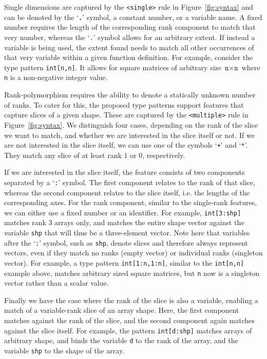 \documentclass[sigconf,screen]{acmart}
\newcommand{\tpdot}{\texttt{\textbf{.}}}
\begin{document}
Single dimensions are captured by the \verb|<single>| rule in Figure~\ref{fig:syntax} and can be denoted by the `\tpdot{}' symbol, a constant number, or a variable name.
A fixed number requires the length of the corresponding rank component to match that very number, whereas the `\texttt{.}' symbol allows for an arbitrary extent.
If instead a variable is being used, the extent found needs to match all other occurrences of that very variable within a given function definition.
For example, consider the type pattern \texttt{int[n,n]}.
It allows for square matrices of arbitrary size $\texttt{n} \times \texttt{n}$ where \texttt{n} is a non-negative integer value.

Rank-polymorphism requires the ability to denote a statically unknown number of ranks.
To cater for this, the proposed type patterns support features that capture slices of a given shape.
These are captured by the \verb|<multiple>| rule in Figure~\ref{fig:syntax}.
We distinguish four cases, depending on the rank of the slice we want to match, and whether we are interested in the slice itself or not.
If we are not interested in the slice itself, we can use one of the symbols `\texttt{+}' and `\texttt{*}'.
They match any slice of at least rank 1 or 0, respectively.

If we are interested in the slice itself, the feature consists of two components separated by a `\texttt{:}' symbol.
The first component relates to the rank of that slice, whereas the second component relates to the slice itself, i.e. the lengths of the corresponding axes.
For the rank component, similar to the single-rank features, we can either use a fixed number or an identifier.
For example, \texttt{int[3:shp]} matches rank 3 arrays only, and matches the entire shape vector against the variable \texttt{shp} that will thus be a three-element vector.
Note here that variables after the `\texttt{:}' symbol, such as \texttt{shp}, denote slices and therefore always represent vectors, even if they match no ranks (empty vector) or individual ranks (singleton vector).
For example, a type pattern \texttt{int[1:n,1:n]}, similar to the \texttt{int[n,n]} example above, matches arbitrary sized square matrices, but \texttt{n} now is a singleton vector rather than a scalar value.

Finally we have the case where the rank of the slice is also a variable, enabling a match of a variable-rank slice of an array shape.
Here, the first component matches against the rank of the slice, and the second component again matches against the slice itself.
For example, the pattern \texttt{int[d:shp]} matches arrays of arbitrary shape, and binds the variable \texttt{d} to the rank of the array, and the variable \texttt{shp} to the shape of the array.
\end{document}
